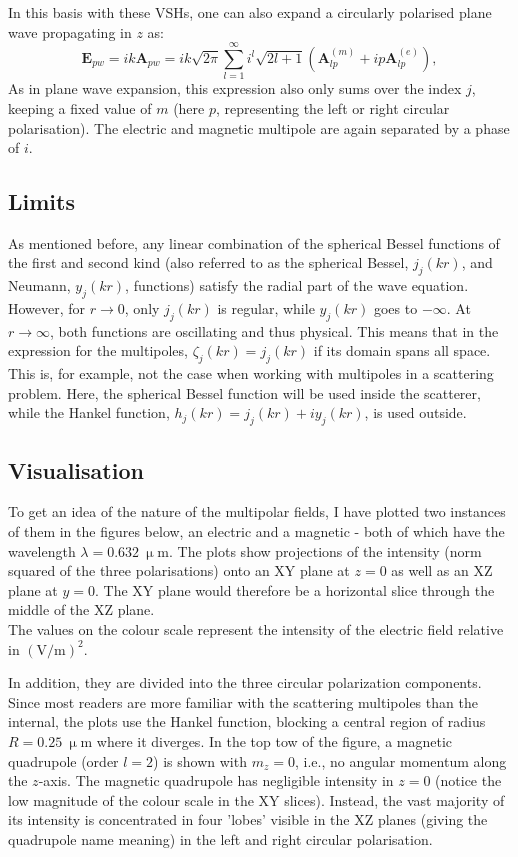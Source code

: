 In this basis with these VSHs, one can also expand a circularly polarised plane wave propagating in \( z \) as:
\begin{equation}\label{eq:rosePW}
    \mathbf{E}_{pw} = ik \mathbf{A}_{pw} = ik \sqrt{2\pi} \sum_{l=1}^{\infty} i^l \sqrt{2l+1} ( \mathbf{A}_{lp}^{(m)} + i p \mathbf{A}_{lp}^{(e)} ),
\end{equation}
As in plane wave expansion, this expression also only sums over the index \( j \), keeping a fixed value of \( m \) (here \( p \), representing the left or right circular polarisation). The electric and magnetic multipole are again separated by a phase of \( i \).

\subsection{Limits}
As mentioned before, any linear combination of the spherical Bessel functions of the first and second kind (also referred to as the spherical Bessel, \( j_j(kr) \), and Neumann, \( y_j(kr) \), functions) satisfy the radial part of the wave equation. However, for \( r \to 0 \), only \( j_j(kr) \) is regular, while \( y_j(kr) \) goes to \( -\infty \). At \( r \to \infty \), both functions are oscillating and thus physical. This means that in the expression for the multipoles, \( \zeta_j(kr) = j_j(kr) \) if its domain spans all space. This is, for example, not the case when working with multipoles in a scattering problem. Here, the spherical Bessel function will be used inside the scatterer, while the Hankel function, \( h_j(kr) = j_j(kr) + i y_j(kr) \), is used outside.

\subsection{Visualisation}
To get an idea of the nature of the multipolar fields, I have plotted two instances of them in the figures below, an electric and a magnetic - both of which have the wavelength \( \lambda = 0.632\ \mathrm{\upmu m} \). The plots show projections of the intensity (norm squared of the three polarisations) onto an XY plane at \( z = 0 \) as well as an XZ plane at \( y = 0 \). The XY plane would therefore be a horizontal slice through the middle of the XZ plane.\\
The values on the colour scale represent the intensity of the electric field relative in $(\mathrm{V/m})^2$.

In addition, they are divided into the three circular polarization components. Since most readers are more familiar with the scattering multipoles than the internal, the plots use the Hankel function, blocking a central region of radius \( R = 0.25\ \mathrm{\upmu m} \) where it diverges. 
In the top tow of the figure, a magnetic quadrupole (order \( l = 2 \)) is shown with \( m_z = 0 \), i.e., no angular momentum along the \( z \)-axis. 
The magnetic quadrupole has negligible intensity in \( z = 0 \) (notice the low magnitude of the colour scale in the XY slices). Instead, the vast majority of its intensity is concentrated in four 'lobes' visible in the XZ planes (giving the quadrupole name meaning) in the left and right circular polarisation.

